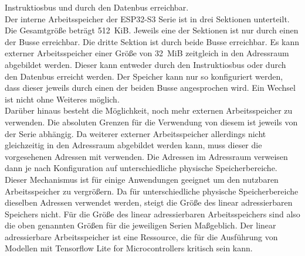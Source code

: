 Instruktiosbus und durch den Datenbus erreichbar\cite{ESP32-C3}.\\ Der interne Arbeitsspeicher der ESP32-S3 Serie ist in drei Sektionen unterteilt. Die Gesamtgröße beträgt \SI{512}{KiB}. Jeweils eine der Sektionen ist nur durch einen der Busse erreichbar. Die dritte Sektion ist durch beide Busse erreichbar. Es kann externer Arbeitsspeicher einer Größe von \SI{32}{MiB} zeitgleich in den Adressraum abgebildet werden. Dieser kann entweder durch den Instruktiosbus oder durch den Datenbus erreicht werden. Der Speicher kann nur so konfiguriert werden, dass dieser jeweils durch einen der beiden Busse angesprochen wird. Ein Wechsel ist nicht ohne Weiteres möglich\cite{ESP32-S3}.\\ Darüber hinaus besteht die Möglichkeit, noch mehr externen Arbeitsspeicher zu verwenden. Die absoluten Grenzen für die Verwendung von diesem ist jeweils von der Serie abhängig. Da weiterer externer Arbeitsspeicher allerdings nicht gleichzeitig in den Adressraum abgebildet werden kann, muss dieser die vorgesehenen Adressen mit verwenden. Die Adressen im Adressraum verweisen dann je nach Konfiguration auf unterschiedliche physische Speicherbereiche. Dieser Mechanismus ist für einige Anwendungen geeignet um den nutzbaren Arbeitsspeicher zu vergrößern. Da für unterschiedliche physische Speicherbereiche dieselben Adressen verwendet werden, steigt die Größe des linear adressierbaren Speichers nicht. Für die Größe des linear adressierbaren Arbeitsspeichers sind also die oben genannten Größen für die jeweiligen Serien Maßgeblich\cite{ESPCompare}\ESPTDM. Der linear adressierbare Arbeitsspeicher ist eine Ressource, die für die Ausführung von Modellen mit Tensorflow Lite for Microcontrollers kritisch sein kann.

